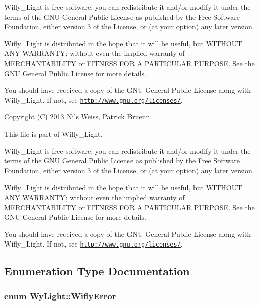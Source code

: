 Wifly\-\_\-\-Light is free software\-: you can redistribute it and/or modify it under the terms of the G\-N\-U General Public License as published by the Free Software Foundation, either version 3 of the License, or (at your option) any later version.

Wifly\-\_\-\-Light is distributed in the hope that it will be useful, but W\-I\-T\-H\-O\-U\-T A\-N\-Y W\-A\-R\-R\-A\-N\-T\-Y; without even the implied warranty of M\-E\-R\-C\-H\-A\-N\-T\-A\-B\-I\-L\-I\-T\-Y or F\-I\-T\-N\-E\-S\-S F\-O\-R A P\-A\-R\-T\-I\-C\-U\-L\-A\-R P\-U\-R\-P\-O\-S\-E. See the G\-N\-U General Public License for more details.

You should have received a copy of the G\-N\-U General Public License along with Wifly\-\_\-\-Light. If not, see \href{http://www.gnu.org/licenses/}{\tt http\-://www.\-gnu.\-org/licenses/}.

\begin{DoxyVerb}Copyright (C) 2013 Nils Weiss, Patrick Bruenn.
\end{DoxyVerb}


This file is part of Wifly\-\_\-\-Light.

Wifly\-\_\-\-Light is free software\-: you can redistribute it and/or modify it under the terms of the G\-N\-U General Public License as published by the Free Software Foundation, either version 3 of the License, or (at your option) any later version.

Wifly\-\_\-\-Light is distributed in the hope that it will be useful, but W\-I\-T\-H\-O\-U\-T A\-N\-Y W\-A\-R\-R\-A\-N\-T\-Y; without even the implied warranty of M\-E\-R\-C\-H\-A\-N\-T\-A\-B\-I\-L\-I\-T\-Y or F\-I\-T\-N\-E\-S\-S F\-O\-R A P\-A\-R\-T\-I\-C\-U\-L\-A\-R P\-U\-R\-P\-O\-S\-E. See the G\-N\-U General Public License for more details.

You should have received a copy of the G\-N\-U General Public License along with Wifly\-\_\-\-Light. If not, see \href{http://www.gnu.org/licenses/}{\tt http\-://www.\-gnu.\-org/licenses/}. 

\subsection{Enumeration Type Documentation}
\hypertarget{namespace_wy_light_afd625f917b07e9c48f67c4383af5773f}{
\subsubsection[{Wifly\-Error}]{\setlength{\rightskip}{0pt plus 5cm}enum {\bf Wy\-Light\-::\-Wifly\-Error}}}\label{namespace_wy_light_afd625f917b07e9c48f67c4383af5773f}


